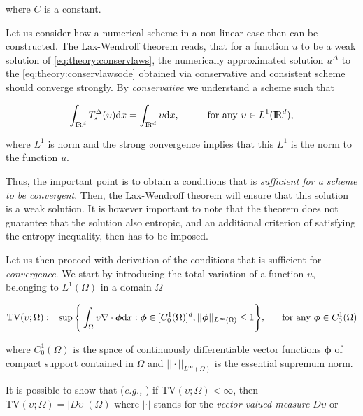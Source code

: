 where $C$ is a constant. 

Let us consider how a numerical scheme in a non-linear case then can be constructed. 
The Lax-Wendroff theorem \cite{Lax:1960} reads, that for a function $u$ to be a weak solution of \ref{eq:theory:conservlaws}, the numerically approximated solution $u^{\Delta}$ to the \ref{eq:theory:conservlawsode} obtained via conservative and consistent scheme should converge strongly. 
By \textit{conservative} we understand a scheme such that 

\begin{equation}
\int_{\text{I\!R}^d} T^{\Delta}_s(\upsilon)\text{d}x = \int_{\text{I\!R}^d}\upsilon\text{d}x, \hspace{10mm} \text{for any } \upsilon\in L^1(\text{I\!R}^d),
\end{equation}

where $L^1$ is norm and the strong convergence implies that this $L^1$ is the norm to the function $u$. 

Thus, the important point is to obtain a conditions that is \textit{sufficient for a scheme to be convergent}. 
Then, the Lax-Wendroff theorem will ensure that this solution is a weak solution. 
It is however important to note that the theorem does not guarantee that the solution also entropic, and an additional criterion of satisfying the entropy inequality, then has to be imposed. 

Let us then proceed with derivation of the conditions that is sufficient for \textit{convergence}. 
We start by introducing the total-variation of a function $u$, belonging to $L^1(\Omega)$ in a domain $\Omega$

\begin{equation}
\text{TV}(\upsilon;\Omega):=\sup\Bigg\{ \int_{\Omega} \upsilon\nabla\cdot\boldsymbol{\phi}\text{d}x: \boldsymbol{\phi}\in [C_0 ^1 (\Omega)]^d, ||\boldsymbol{\phi}||_{L^{\infty}(\Omega)}\leq 1 \Bigg\}, \hspace{5mm} \text{ for any }\boldsymbol{\phi} \in C_0 ^1 (\Omega)
\end{equation}

where $C_0 ^1(\Omega)$ is the space of continuously differentiable vector functions $\boldsymbol{\phi}$ of compact support contained in $\Omega$ and $||\cdot||_{L^{\infty}(\Omega)}$ is the essential supremum norm. 

It is possible to show that (\textit{e.g.,} \cite{Luigi:2002}) if $\text{TV}(\upsilon ; \Omega) < \infty$, then $\text{TV}(\upsilon ; \Omega) = |D\upsilon|(\Omega)$ where $|\cdot|$ stands for the \textit{vector-valued measure} $D\upsilon$ or 

